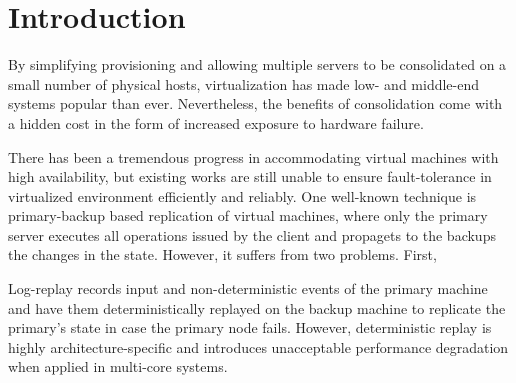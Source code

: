 \section{Introduction} \label{sec:intro}

By simplifying provisioning and allowing multiple servers to be consolidated on a small 
number of physical hosts, virtualization has made low- and middle-end systems popular 
than ever. Nevertheless, the benefits of consolidation come with a hidden cost in the 
form of increased exposure to hardware failure. 




There has been a tremendous progress in accommodating virtual machines with high availability, 
but existing works are still unable to ensure fault-tolerance in virtualized environment efficiently and reliably. 
One well-known technique is primary-backup based replication of virtual machines, where only the primary 
server executes all operations issued by the client and propagets to the backups the changes in the state. However, 
it suffers from two problems. First, 



Log-replay records input and non-deterministic events of the primary machine and have them 
deterministically replayed on the backup machine to replicate the primary's state in case 
the primary node fails. However, deterministic replay is highly architecture-specific and 
introduces unacceptable performance degradation when applied in multi-core systems.

